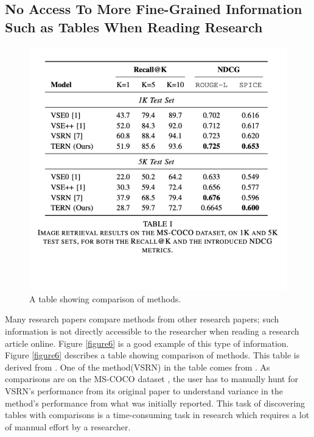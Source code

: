\subsection{No Access To More Fine-Grained Information Such as Tables When Reading Research}
\begin{figure}[h]
    \centering
    \includegraphics[width=\maxwidth{\textwidth}]{src/images/table-example.pdf}
    \caption{A table showing comparison of methods.}
    \label{figure\arabic{figurecounter}}
\end{figure}
Many research papers compare methods from other research papers; such information is not directly accessible to the researcher when reading a research article online. Figure \ref{figure6} is a good example of this type of information. Figure \ref{figure6} describes a table showing comparison of methods. This table is derived from \cite{messina2020transformer}. One of the method(VSRN) in the table comes from \cite{li2019visual}. As comparisons are on the MS-COCO dataset \parencite{lin2014microsoft}, the user has to manually hunt for VSRN's performance from its original paper to understand variance in the method's performance from what was initially reported. This task of discovering tables with comparisons is a time-consuming task in research which requires a lot of mannual effort by a researcher.  


